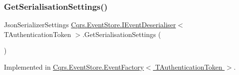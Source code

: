 \mbox{\label{interfaceCqrs_1_1EventStore_1_1IEventDeserialiser_aa2859d10fd556b743679079ac15ffdde}} 
\subsubsection{\texorpdfstring{Get\+Serialisation\+Settings()}{GetSerialisationSettings()}}
{\footnotesize\ttfamily Json\+Serializer\+Settings \hyperlink{interfaceCqrs_1_1EventStore_1_1IEventDeserialiser}{Cqrs.\+Event\+Store.\+I\+Event\+Deserialiser}$<$ T\+Authentication\+Token $>$.Get\+Serialisation\+Settings (\begin{DoxyParamCaption}{ }\end{DoxyParamCaption})}



Implemented in \hyperlink{classCqrs_1_1EventStore_1_1EventFactory_a4e52c4fd639d1af97b1ecc5052189783}{Cqrs.\+Event\+Store.\+Event\+Factory$<$ T\+Authentication\+Token $>$}.

